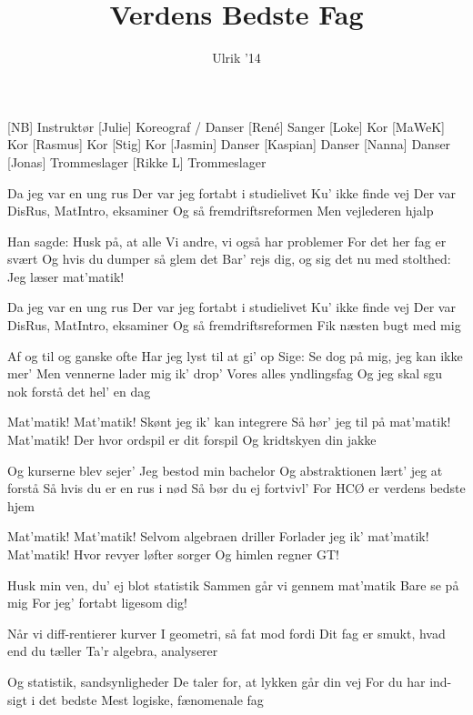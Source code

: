 \documentclass[a4paper,11pt]{article}
\title{Verdens Bedste Fag}
\author{Ulrik '14}
\begin{document}
\maketitle

\begin{roles}
[NB] Instruktør
[Julie] Koreograf / Danser
[René] Sanger
[Loke] Kor
[MaWeK] Kor
[Rasmus] Kor
[Stig] Kor
[Jasmin] Danser
[Kaspian] Danser
[Nanna] Danser
[Jonas] Trommeslager
[Rikke L] Trommeslager
\end{roles}

\begin{song}
 Da jeg var en ung rus
Der var jeg fortabt i studielivet
Ku' ikke finde vej
Der var DisRus, MatIntro, eksaminer
Og så fremdriftsreformen
Men vejlederen hjalp

 Han sagde: Husk på, at alle
Vi andre, vi også har problemer
For det her fag er svært
Og hvis du dumper så glem det
Bar' rejs dig, og sig det nu med stolthed:
Jeg læser mat'matik!

 Da jeg var en ung rus
Der var jeg fortabt i studielivet
Ku' ikke finde vej
Der var DisRus, MatIntro, eksaminer
Og så fremdriftsreformen
Fik næsten bugt med mig

 Af og til og ganske ofte
Har jeg lyst til at gi' op
Sige: Se dog på mig, jeg kan ikke mer'
Men vennerne lader mig ik' drop'
Vores alles yndlingsfag
Og jeg skal sgu nok forstå det hel' en dag

 Mat'matik! Mat'matik!
Skønt jeg ik' kan integrere
Så hør' jeg til på mat'matik! Mat'matik!
Der hvor ordspil er dit forspil
Og kridtskyen din jakke

 Og kurserne blev sejer'
Jeg bestod min bachelor
Og abstraktionen lært' jeg at forstå
Så hvis du er en rus i nød
Så bør du ej fortvivl'
For HCØ er verdens bedste hjem

 Mat'matik! Mat'matik!
Selvom algebraen driller
Forlader jeg ik' mat'matik! Mat'matik!
Hvor revyer løfter sorger
Og himlen regner GT!

 Husk min ven, du' ej blot statistik
Sammen går vi gennem mat'matik
Bare se på mig
For jeg' fortabt ligesom dig!

 Når vi diff-rentierer kurver
I geometri, så fat mod fordi
Dit fag er smukt, hvad end du tæller
Ta'r algebra, analyserer

 Og statistik, sandsynligheder
De taler for, at lykken går din vej
For du har ind-sigt i det bedste
Mest logiske, fænomenale fag


\end{song}
\end{document}
